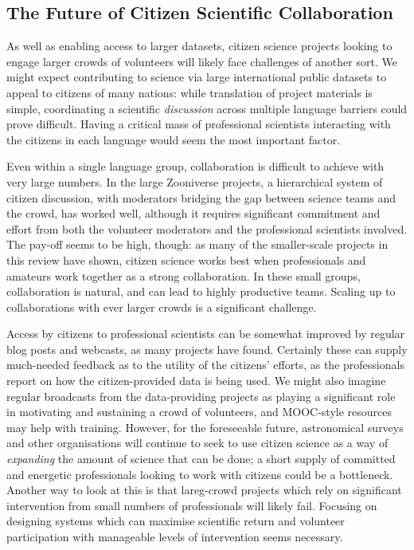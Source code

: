 \documentclass{ar2e}
\begin{document}
 


\subsection{The Future of Citizen Scientific Collaboration}

As well as enabling access to larger datasets,  citizen science projects
looking to engage larger crowds of volunteers will likely face   challenges of
another sort.  We might expect contributing to science via large international
public datasets to appeal to citizens of many nations: while translation of
project materials is simple,  coordinating a scientific \textit{discussion}
across multiple language barriers could prove difficult.  Having a critical
mass of professional scientists interacting with the citizens in each language
would seem the most important factor.

Even within a single language group, collaboration is difficult to achieve
with  very large numbers. In the large Zooniverse projects, a hierarchical
system of citizen discussion, with  moderators bridging the gap between
science teams and the crowd, has worked well, although it requires significant
commitment and effort from both the volunteer moderators and the professional
scientists involved.  The pay-off seems to be high, though:  as many of the
smaller-scale projects in this review have shown, citizen science works best
when professionals and amateurs work together as a strong collaboration. In
these small groups, collaboration is natural, and can lead to highly
productive teams. Scaling up to collaborations with ever larger crowds is a
significant challenge.

Access by citizens to professional scientists can be somewhat improved by
regular blog posts and webcasts, as many projects have found. Certainly these
can supply much-needed feedback as to the utility of the citizens' efforts, as
the professionals report on how the citizen-provided data is being used.  We
might also imagine regular broadcasts from the data-providing  projects as
playing a significant role in motivating and sustaining a crowd of volunteers,
and MOOC-style resources may help with training. However, for the foreseeable
future, astronomical surveys and other organisations will continue to seek to
use citizen science as a  way of \textit{expanding} the amount of science that
can be done; a short supply of committed and energetic professionals looking
to work with citizens could be a bottleneck. Another way to look at this is
that lareg-crowd projects which rely on significant intervention from small
numbers of professionals will likely fail. Focusing on designing systems which
can maximise scientific return and volunteer participation with manageable
levels of intervention seems necessary. 
\end{document}
